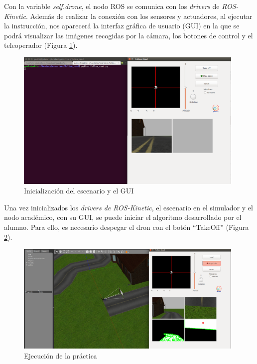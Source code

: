 Con la variable \textit{self.drone}, el nodo ROS se comunica con los \textit{drivers} de \textit{ROS-Kinetic}.
Además de realizar la conexión con los sensores y actuadores, al ejecutar la instrucción, nos aparecerá la interfaz gráfica de usuario (GUI) en la que se podrá visualizar las imágenes recogidas por la cámara, los botones de control y el teleoperador (Figura \ref{fig.inaGfr}).

\begin{figure}[H]
  \begin{center}
    \includegraphics[width=0.98\textwidth]{figures/init_na_fr.png}
		\caption{Inicialización del escenario y el GUI}
		\label{fig.inaGfr}
		\end{center}
\end{figure}

Una vez inicializados los \textit{drivers de ROS-Kinetic}, el escenario en el simulador y el nodo académico, con su GUI, se puede iniciar el algoritmo desarrollado por el alumno. Para ello, es necesario despegar el dron con el botón ``TakeOff'' (Figura \ref{fig.eefr}).

\begin{figure}[H]
  \begin{center}
    \includegraphics[width=0.98\textwidth]{figures/ejec_estat_fr.png}
		\caption{Ejecución de la práctica}
		\label{fig.eefr}
		\end{center}
\end{figure}

